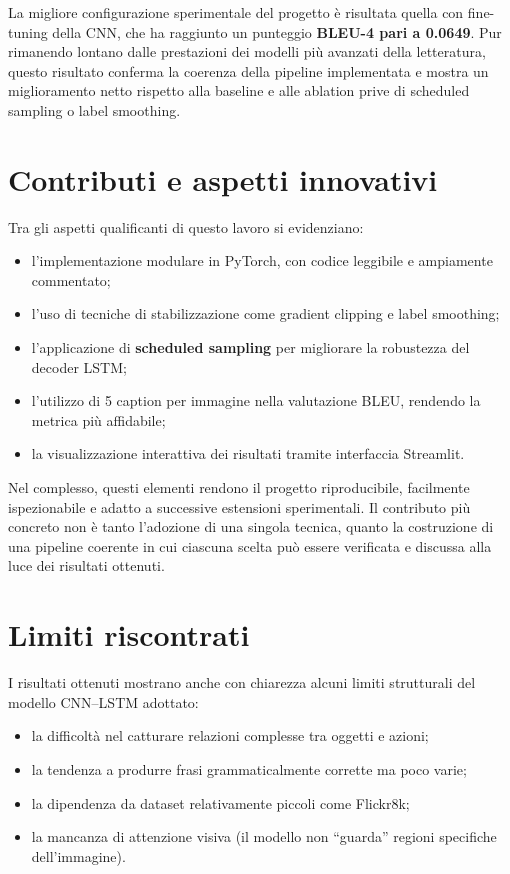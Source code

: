 \documentclass[11pt,a4paper]{report}
\begin{document}
\begin{tcolorbox}[title=Risultato principale]
La migliore configurazione sperimentale del progetto è risultata quella con fine-tuning della CNN, che ha raggiunto un punteggio \textbf{BLEU-4 pari a 0.0649}. Pur rimanendo lontano dalle prestazioni dei modelli più avanzati della letteratura, questo risultato conferma la coerenza della pipeline implementata e mostra un miglioramento netto rispetto alla baseline e alle ablation prive di scheduled sampling o label smoothing.
\end{tcolorbox}

\section{Contributi e aspetti innovativi}

Tra gli aspetti qualificanti di questo lavoro si evidenziano:
\begin{itemize}
  \item l’implementazione modulare in PyTorch, con codice leggibile e ampiamente commentato;
  \item l’uso di tecniche di stabilizzazione come gradient clipping e label smoothing;
  \item l’applicazione di \textbf{scheduled sampling} per migliorare la robustezza del decoder LSTM;
  \item l’utilizzo di 5 caption per immagine nella valutazione BLEU, rendendo la metrica più affidabile;
  \item la visualizzazione interattiva dei risultati tramite interfaccia Streamlit.
\end{itemize}

Nel complesso, questi elementi rendono il progetto riproducibile, facilmente ispezionabile e adatto a successive estensioni sperimentali. Il contributo più concreto non è tanto l'adozione di una singola tecnica, quanto la costruzione di una pipeline coerente in cui ciascuna scelta può essere verificata e discussa alla luce dei risultati ottenuti.

\section{Limiti riscontrati}

I risultati ottenuti mostrano anche con chiarezza alcuni limiti strutturali del modello CNN--LSTM adottato:
\begin{itemize}
  \item la difficoltà nel catturare relazioni complesse tra oggetti e azioni;
  \item la tendenza a produrre frasi grammaticalmente corrette ma poco varie;
  \item la dipendenza da dataset relativamente piccoli come Flickr8k;
  \item la mancanza di attenzione visiva (il modello non “guarda” regioni specifiche dell’immagine).
\end{itemize}
\end{document}
